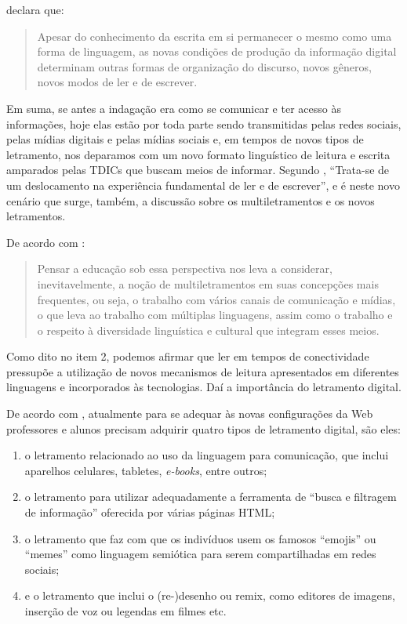 \documentclass{textolivre}
\begin{document}
\textcite[p. 28]{goulart__2011} declara que: 

\begin{quote}
    Apesar do conhecimento da escrita em si permanecer o mesmo como uma forma de linguagem, as novas condições de produção da informação digital determinam outras formas de organização do discurso, novos gêneros, novos modos de ler e de escrever.
\end{quote}

Em suma, se antes a indagação era como se comunicar e ter acesso às informações, hoje elas estão por toda parte sendo transmitidas pelas redes sociais, pelas mídias digitais e pelas mídias sociais e, em tempos de novos tipos de letramento, nos deparamos com um novo formato linguístico de leitura e escrita amparados pelas TDICs que buscam meios de informar. Segundo \textcite[p. 32]{furtado_os_2000}, “Trata-se de um deslocamento na experiência fundamental de ler e de escrever”, e é neste novo cenário que surge, também, a discussão sobre os multiletramentos e os novos letramentos.          

De acordo com \textcite[p. 65]{coscarelli_multiletramentos_2019}:

\begin{quote}
    Pensar a educação sob essa perspectiva nos leva a considerar, inevitavelmente, a noção de multiletramentos em suas concepções mais frequentes, ou seja, o trabalho com vários canais de comunicação e mídias, o que leva ao trabalho com múltiplas linguagens, assim como o trabalho e o respeito à diversidade linguística e cultural que integram esses meios.
\end{quote}

Como dito no item 2, podemos afirmar que ler em tempos de conectividade pressupõe a utilização de novos mecanismos de leitura apresentados em diferentes linguagens e incorporados às tecnologias. Daí a importância do letramento digital. 

De acordo com \textcite{rojo_letramentos_2019}, atualmente para se adequar às novas configurações da Web professores e alunos precisam adquirir quatro tipos de letramento digital, são eles:
 
\begin{enumerate}[label={\alph*}]
    \item o letramento relacionado ao uso da linguagem para comunicação, que inclui aparelhos celulares, tabletes, \textit{e-books}, entre outros; 
    \item o letramento para utilizar adequadamente a ferramenta de “busca e filtragem de informação” oferecida por várias páginas HTML; 
    \item o letramento que faz com que os indivíduos usem os famosos “emojis” ou “memes” como linguagem semiótica para serem compartilhadas em redes sociais;
    \item e o letramento que inclui o (re-)desenho ou remix, como editores de imagens, inserção de voz ou legendas em filmes etc. 
\end{enumerate}
\end{document}
